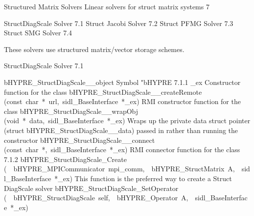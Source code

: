 \documentclass{article}
\begin{document}
\begin{cxxentry}
{}
        {Structured Matrix Solvers}
        {}
        {Linear solvers for struct matrix systems}
        {7}
\begin{cxxnames}
\cxxitem{}
        {StructDiagScale Solver}
        {}
        {
}
        {7.1}
\cxxitem{}
        {Struct Jacobi Solver}
        {}
        {
}
        {7.2}
\cxxitem{}
        {Struct PFMG Solver}
        {}
        {
}
        {7.3}
\cxxitem{}
        {Struct SMG Solver}
        {}
        {
}
        {7.4}
\end{cxxnames}
\begin{cxxdoc}


These solvers use structured matrix/vector storage schemes.


\end{cxxdoc}
\begin{cxxentry}
{}
        {StructDiagScale Solver}
        {}
        {
}
        {7.1}
\begin{cxxnames}
        {bHYPRE\_StructDiagScale\_\_object}
        {}
        {
Symbol "bHYPRE}
        {7.1.1}
        {\_ex}
        {}
        {
Constructor function for the class}
        {}
\label{cxx.7.1.11}
        {bHYPRE\_StructDiagScale\_\_createRemote}
        {(const\ char\ *\ url,\ sidl\_BaseInterface\ *\_ex)}
        {
RMI constructor function for the class}
        {}
\label{cxx.7.1.12}
        {bHYPRE\_StructDiagScale\_\_wrapObj}
        {(void\ *\ data,\ sidl\_BaseInterface\ *\_ex)}
        {
Wraps up the private data struct pointer (struct bHYPRE\_StructDiagScale\_\_data) passed in rather than running the constructor}
        {}
\label{cxx.7.1.13}
        {bHYPRE\_StructDiagScale\_\_connect}
        {(const\ char\ *,\ sidl\_BaseInterface\ *\_ex)}
        {
RMI connector function for the class}
        {7.1.2}
        {bHYPRE\_StructDiagScale\_Create}
        {(\ \ bHYPRE\_MPICommunicator\ mpi\_comm,\ \ bHYPRE\_StructMatrix\ A,\ \ sidl\_BaseInterface\ *\_ex)}
        {
This function is the preferred way to create a Struct DiagScale solver}
        {}
\label{cxx.7.1.14}
        {bHYPRE\_StructDiagScale\_SetOperator}
        {(\ \ bHYPRE\_StructDiagScale\ self,\ \ bHYPRE\_Operator\ A,\ \ sidl\_BaseInterface\ *\_ex)}

\end{cxxnames}
\end{cxxentry}
\end{cxxentry}
\end{document}
